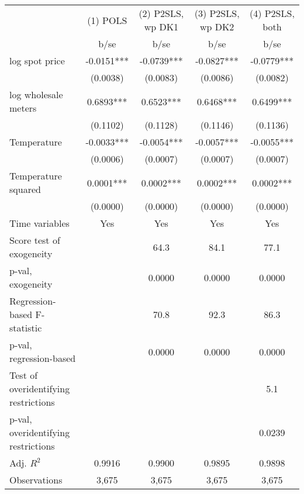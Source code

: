 \begin{tabular}{lcccc}\toprule
                    &    (1) POLS   &(2) P2SLS, wp DK1   &(3) P2SLS, wp DK2   &(4) P2SLS, both   \\
                    &        b/se   &        b/se   &        b/se   &        b/se   \\
\midrule
log spot price      &     -0.0151***&     -0.0739***&     -0.0827***&     -0.0779***\\
                    &    (0.0038)   &    (0.0083)   &    (0.0086)   &    (0.0082)   \\
log wholesale meters&      0.6893***&      0.6523***&      0.6468***&      0.6499***\\
                    &    (0.1102)   &    (0.1128)   &    (0.1146)   &    (0.1136)   \\
Temperature         &     -0.0033***&     -0.0054***&     -0.0057***&     -0.0055***\\
                    &    (0.0006)   &    (0.0007)   &    (0.0007)   &    (0.0007)   \\
Temperature squared &      0.0001***&      0.0002***&      0.0002***&      0.0002***\\
                    &    (0.0000)   &    (0.0000)   &    (0.0000)   &    (0.0000)   \\
Time variables      &         Yes   &         Yes   &         Yes   &         Yes   \\
\midrule
Score test of exogeneity&               &        64.3   &        84.1   &        77.1   \\
p-val, exogeneity   &               &      0.0000   &      0.0000   &      0.0000   \\
Regression-based F-statistic&               &        70.8   &        92.3   &        86.3   \\
p-val, regression-based&               &      0.0000   &      0.0000   &      0.0000   \\
Test of overidentifying restrictions&               &               &               &         5.1   \\
p-val, overidentifying restrictions&               &               &               &      0.0239   \\
Adj. \(R^2\)        &      0.9916   &      0.9900   &      0.9895   &      0.9898   \\
Observations        &       3,675   &       3,675   &       3,675   &       3,675   \\
\bottomrule\end{tabular}
